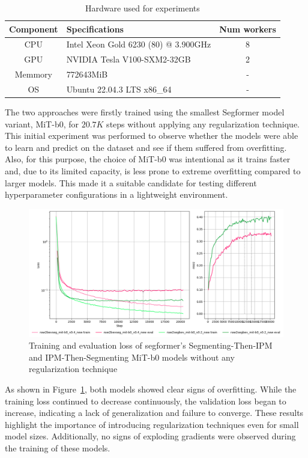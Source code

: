 \begin{table}[h]
    \centering
    \begin{tabular}{c l c}
        \toprule
        \textbf{Component} & \textbf{Specifications} & \textbf{Num workers} \\
        \midrule
        CPU         & Intel Xeon Gold 6230 (80) @ 3.900GHz & 8 \\
        GPU         & NVIDIA Tesla V100-SXM2-32GB & 2 \\      
        Memmory     & 772643MiB & - \\
        OS          & Ubuntu 22.04.3 LTS x86\_64 & - \\
        \bottomrule
    \end{tabular}
    \caption{ Hardware used for experiments }
    \label{tab:hardware}
\end{table}

The two approaches were firstly trained using the smallest Segformer model variant, MiT-b0, for $20.7K$ steps without applying any regularization technique. This initial experiment was performed to observe whether the models were able to learn and predict on the dataset and see if them suffered from overfitting. Also, for this purpose, the choice of MiT-b0 was intentional as it trains faster and, due to its limited capacity, is less prone to extreme overfitting compared to larger models. This made it a suitable candidate for testing different hyperparameter configurations in a lightweight environment.

\begin{figure}[h!]
    \centering
    \includegraphics[width=0.7\linewidth]{./images/experiments/overfitting_bev_nu.png}
    \caption{Training and evaluation loss of segformer's Segmenting-Then-IPM and IPM-Then-Segmenting MiT-b0 models without any regularization technique}
    \label{fig:overfitting_mit-b0}
\end{figure}

As shown in Figure~\ref{fig:overfitting_mit-b0}, both models showed clear signs of overfitting. While the training loss continued to decrease continuously, the validation loss began to increase, indicating a lack of generalization and failure to converge. These results highlight the importance of introducing regularization techniques even for small model sizes. Additionally, no signs of exploding gradients were observed during the training of these models. 

